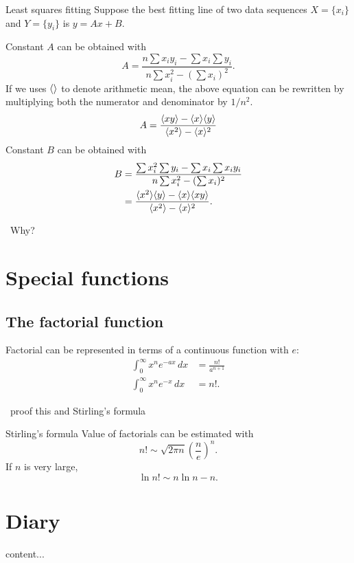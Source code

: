 \documentclass[11pt,a4paper,fleqn]{article}
\numberwithin{equation}{section}
\newcommand{\TODO}{\textcolor{ErrorRed}{\fbox{TODO}}\ }
\DeclarePairedDelimiter\arithMean{\langle}{\rangle}
\begin{document}
\begin{fact}{Least squares fitting}{}
    Suppose the best fitting line of two data sequences $X = \{x_i\}$ and $Y = \{y_i\}$ is $y=Ax+B$.
    
    Constant $A$ can be obtained with
    \begin{equation*}
        A = \frac{n\sum x_i y_i - \sum x_i \sum y_i}{n \sum x_i^2 - (\sum x_i)^2}.
    \end{equation*}
    If we uses $\arithMean{}$ to denote arithmetic mean, the above equation can be rewritten by multiplying both the numerator and denominator by $1/n^2$.
    \begin{equation*}
        A = \frac{\arithMean{xy} -\arithMean{x}\arithMean{y}}{\arithMean{x^2}-\arithMean{x}^2}
    \end{equation*}
    Constant $B$ can be obtained with
    \begin{align*}
        B
        &= \frac{\sum x_i^2 \sum y_i - \sum x_i \sum x_i y_i}{n\sum x_i^2 - (\sum x_i)^2} \\
        &= \frac{\arithMean{x^2}\arithMean{y}-\arithMean{x}\arithMean{xy}}{\arithMean{x^2}-\arithMean{x}^2}.
    \end{align*}
    
\end{fact}

\TODO Why?

\section{Special functions}

\subsection{The factorial function}

Factorial can be represented in terms of a continuous function with $e$:
\begin{align*}
    \int_{0}^{\infty}x^{n}e^{-a x}\,dx&=\frac{n!}{a^{n+1}} \\
    \int_{0}^{\infty}x^{n}e^{-x}\,dx&=n!.
\end{align*}

\TODO proof this and Stirling's formula

\begin{fact}{Stirling's formula}{}
    Value of factorials can be estimated with
    \begin{equation*}
        n!\sim \sqrt{2\pi n}\left(\frac{n}{e}\right)^n.
    \end{equation*}
    If $n$ is very large,
    \begin{equation*}
        \ln n! \sim n\ln n -n.
    \end{equation*}
\end{fact}

\section{Diary}

\begin{fact}{}{}
    content...
\end{fact}
\end{document}
